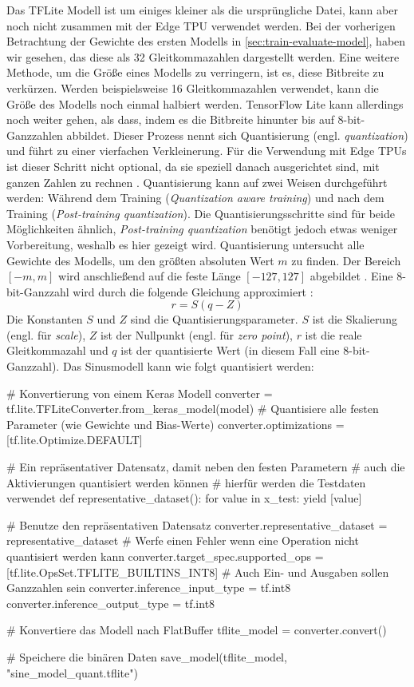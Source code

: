 Das TFLite Modell ist um einiges kleiner als die ursprüngliche Datei,
kann aber noch nicht zusammen mit der Edge TPU verwendet werden.
Bei der vorherigen Betrachtung der Gewichte des ersten Modells
in \autoref{sec:train-evaluate-model}, haben wir gesehen, das
diese als \qty{32}{\bit} Gleitkommazahlen dargestellt werden.
Eine weitere Methode, um die Größe eines Modells zu verringern,
ist es, diese Bitbreite zu verkürzen.
Werden beispielsweise \qty{16}{\bit} Gleitkommazahlen verwendet,
kann die Größe des Modells noch einmal halbiert werden.
TensorFlow Lite kann allerdings noch weiter gehen, als dass, indem es die
Bitbreite hinunter bis auf 8-bit-Ganzzahlen abbildet.
Dieser Prozess nennt sich Quantisierung
(engl. \textit{quantization}) und führt zu einer vierfachen Verkleinerung.
Für die Verwendung mit Edge TPUs ist dieser Schritt nicht optional,
da sie speziell danach ausgerichtet sind,
mit ganzen Zahlen zu rechnen \parencite{online:models-on-edge-tpu}.
Quantisierung kann auf zwei Weisen durchgeführt werden:
Während dem Training (\textit{Quantization aware training})
und nach dem Training (\textit{Post-training quantization}).
Die Quantisierungsschritte sind für beide Möglichkeiten ähnlich,
\textit{Post-training quantization} benötigt jedoch etwas weniger Vorbereitung,
weshalb es hier gezeigt wird.
Quantisierung untersucht alle Gewichte des Modells, um
den größten absoluten Wert $m$ zu finden. Der Bereich $[-m,m]$
wird anschließend auf die feste Länge $[-127,127]$
abgebildet \parencite[686]{book:hands-on-ml}.
Eine 8-bit-Ganzzahl wird durch die folgende Gleichung ap­pro­xi­mie­rt \parencite{DBLP:quantization}:
\begin{equation}
  r = S(q - Z)
  \label{eq:quant}
\end{equation}
Die Konstanten $S$ und $Z$ sind die Quantisierungsparameter.
$S$ ist die Skalierung (engl. für \textit{scale}),
$Z$ ist der Nullpunkt (engl. für \textit{zero point}),
$r$ ist die reale Gleitkommazahl und $q$ ist der quantisierte Wert
(in diesem Fall eine 8-bit-Ganzzahl).
Das Sinusmodell kann wie folgt quantisiert werden:
\begin{pythoncode}
# Konvertierung von einem Keras Modell
converter = tf.lite.TFLiteConverter.from_keras_model(model)
# Quantisiere alle festen Parameter (wie Gewichte und Bias-Werte)
converter.optimizations = [tf.lite.Optimize.DEFAULT]

# Ein repräsentativer Datensatz, damit neben den festen Parametern
# auch die Aktivierungen quantisiert werden können
# hierfür werden die Testdaten verwendet
def representative_dataset():
    for value in x_test:
        yield [value]

# Benutze den repräsentativen Datensatz
converter.representative_dataset = representative_dataset
# Werfe einen Fehler wenn eine Operation nicht quantisiert werden kann
converter.target_spec.supported_ops = [tf.lite.OpsSet.TFLITE_BUILTINS_INT8]
# Auch Ein- und Ausgaben sollen Ganzzahlen sein
converter.inference_input_type = tf.int8
converter.inference_output_type = tf.int8

# Konvertiere das Modell nach FlatBuffer
tflite_model = converter.convert()

# Speichere die binären Daten
save_model(tflite_model, "sine_model_quant.tflite")
\end{pythoncode}
